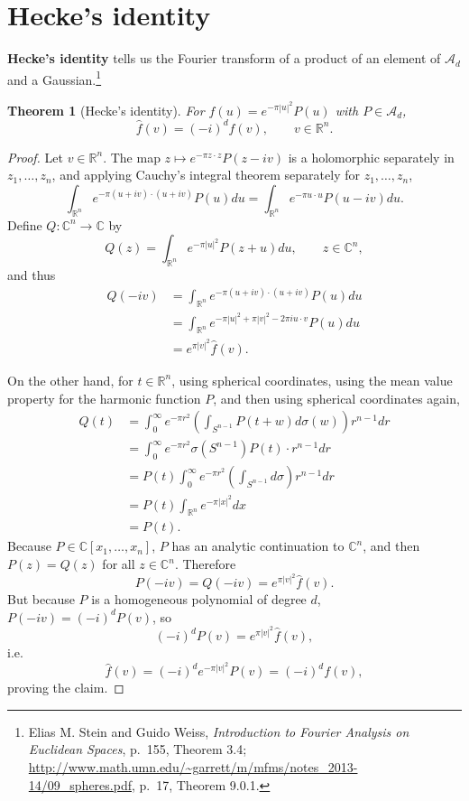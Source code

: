 \documentclass{article}
\newtheorem{theorem}{Theorem}
\theoremstyle{definition}
\begin{document}
\section{Hecke's identity}
\textbf{Hecke's identity} 
tells us the Fourier transform of a product of an element of
$\mathscr{A}_d$ and a Gaussian.\footnote{Elias M. Stein and Guido Weiss, {\em Introduction to Fourier Analysis on Euclidean Spaces},
p.~155, Theorem 3.4; 
\url{http://www.math.umn.edu/~garrett/m/mfms/notes_2013-14/09_spheres.pdf}, p.~17, Theorem 9.0.1.}

\begin{theorem}[Hecke's identity]
For $f(u) = e^{-\pi |u|^2} P(u)$ with $P \in \mathscr{A}_d$,
\[
\widehat{f}(v) = (-i)^{d} f(v),\qquad v \in \mathbb{R}^n.
\]
\end{theorem}
\begin{proof}
Let $v \in \mathbb{R}^n$. The map
$z \mapsto e^{-\pi z \cdot z} P(z-iv)$ is a holomorphic separately in $z_1,\ldots,z_n$, and applying Cauchy's integral theorem separately
for $z_1,\ldots,z_n$,
\[
\int_{\mathbb{R}^n} e^{-\pi(u+iv)\cdot (u+iv)} P(u) du 
=\int_{\mathbb{R}^n} e^{-\pi u\cdot u} P(u-iv) du.
\]
Define $Q:\mathbb{C}^n \to \mathbb{C}$ by 
\[
Q(z) = \int_{\mathbb{R}^n} e^{-\pi |u|^2} P(z+u) du,\qquad z \in \mathbb{C}^n,
\]
and thus
\begin{align*}
Q(-iv)& = \int_{\mathbb{R}^n} e^{-\pi (u+iv)\cdot(u+iv)} P(u) du\\
&=\int_{\mathbb{R}^n} e^{-\pi |u|^2 + \pi|v|^2 - 2\pi i u\cdot v} P(u) du\\
&=e^{\pi |v|^2} \widehat{f}(v).
\end{align*}

On the other hand, for $t \in \mathbb{R}^n$, using spherical coordinates, using the mean value property for the harmonic function $P$,
and then using spherical coordinates again,
\begin{align*}
Q(t)&=\int_0^\infty e^{-\pi r^2} \left( \int_{S^{n-1}} P(t+w) d\sigma(w) \right) r^{n-1} dr\\
&=\int_0^\infty e^{-\pi r^2} \sigma(S^{n-1}) P(t) \cdot r^{n-1} dr\\
&=P(t) \int_0^\infty e^{-\pi r^2}  \left( \int_{S^{n-1}} d\sigma \right) r^{n-1} dr\\
&=P(t) \int_{\mathbb{R}^n} e^{-\pi |x|^2} dx\\
&=P(t).
\end{align*}
Because $P \in \mathbb{C}[x_1,\ldots,x_n]$, $P$ has an analytic continuation to $\mathbb{C}^n$, and then
$P(z) = Q(z)$ for all $z \in \mathbb{C}^n$. 
Therefore
\[
P(-iv) = Q(-iv) = e^{\pi |v|^2} \widehat{f}(v).
\]
But because $P$ is a homogeneous polynomial of degree $d$, $P(-iv) = (-i)^d P(v)$, so
\[
(-i)^d P(v) =  e^{\pi |v|^2} \widehat{f}(v),
\]
i.e.
\[
\widehat{f}(v) = (-i)^d e^{-\pi |v|^2} P(v) = (-i)^d f(v),
\]
proving the claim.
\end{proof}
\end{document}
